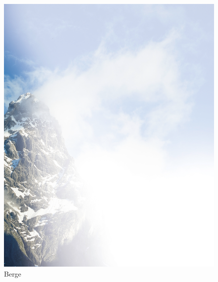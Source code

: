\documentclass[ngerman,a4paper,11pt]{scrreprt}
\begin{document}
\begin{figure}[H]
\centering
\includegraphics[width=\textwidth,height=.8\textheight,keepaspectratio]{Bilder/Bilder/750_0010_13876_Hintergrund_Einklang_Todesanzeige.png}
\caption{\label{img_Berge}Berge}
\end{figure}
\end{document}
